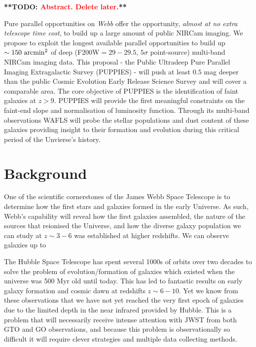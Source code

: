 \documentclass[12pt]{article}
\newcommand{\todo}[1]{\textbf{**TODO: \textcolor{red}{#1}**}}
\begin{document}
%
%






\todo{Abstract. Delete later.}

Pure parallel opportunities on \emph{Webb} offer the opportunity, \emph{almost at no extra telescope time cost}, to build up a large amount of public NIRCam imaging. We propose to exploit the longest available parallel opportunities to build up $\sim 150\ {\rm arcmin^2}$ of deep (F200W$=29-29.5$, $5\sigma$ point-source) multi-band NIRCam imaging data. This proposal - the Public Ultradeep Pure Parallel Imaging Extragalactic Survey (PUPPIES) - will push at least $0.5$ mag deeper than the public Cosmic Evolution Early Release Science Survey and will cover a comparable area. The core objective of PUPPIES is the identification of faint galaxies at $z>9$. PUPPIES will provide the first meaningful constraints on the faint-end slope and normalisation of luminosity function. Through its  multi-band observations WAFLS will probe the stellar populations and dust content of these galaxies providing insight to their formation and evolution during this critical period of the Unvierse's history.



\clearpage

\justification          %

\section{Background}

One of the scientific cornerstones of the James Webb Space Telescope is to determine how the first stars and galaxies formed in the early Universe. As such, Webb's capability will reveal how the first galaxies assembled, the nature of the sources that reionised the Universe, and how the diverse galaxy population we can study at $z \sim 3-6$ was established at higher redshifts.  We can observe galaxies up to

The Hubble Space Telescope has spent several 1000s of orbits over two decades to solve the problem of evolution/formation of galaxies which existed when the universe was 500 Myr old until today. This has led to fantastic results on early galaxy formation and cosmic dawn at redshifts $z \sim 6-10$. Yet we know from these observations that we have not yet reached the very first epoch of galaxies due to the limited depth in the near infrared provided by Hubble. This is a problem that will necessarily receive intense attention with JWST from both GTO and GO observations, and because this problem is observationally so difficult it will require clever strategies and multiple data collecting methods.
\end{document}
